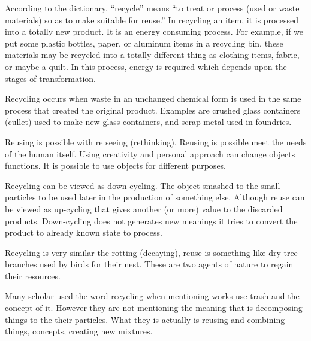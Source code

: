 According to the dictionary, “recycle” means “to treat or process (used or waste materials) so as to make suitable for reuse.” In recycling an item, it is processed into a totally new product. It is an energy consuming process. For example, if we put some plastic bottles, paper, or aluminum items in a recycling bin, these materials may be recycled into a totally different thing as clothing items, fabric, or maybe a quilt. In this process, energy is required which depends upon the stages of transformation.

Recycling occurs when waste in an unchanged chemical form is used in the same process that created the original product. Examples are crushed glass containers (cullet) used to make new glass containers, and scrap metal used in foundries. 

Reusing is possible with re seeing (rethinking). Reusing is possible meet the needs of the human itself. Using creativity and personal approach can change objects functions. It is possible to use objects for different purposes. 

Recycling can be viewed as down-cycling. The object smashed to the small particles to be used later in the production of something else. Although reuse can be viewed as up-cycling that gives another (or more) value to the discarded products. Down-cycling does not generates new meanings it tries to convert the product to already known state to process. 

Recycling is very similar the rotting (decaying), reuse is something like dry tree branches used by birds for their nest. These are two agents of nature to regain their resources.

Many scholar used the word recycling when mentioning works use trash and the concept of it. However they are not mentioning the meaning that is decomposing things to the their particles. What they is actually is reusing and combining things, concepts, creating new mixtures.
